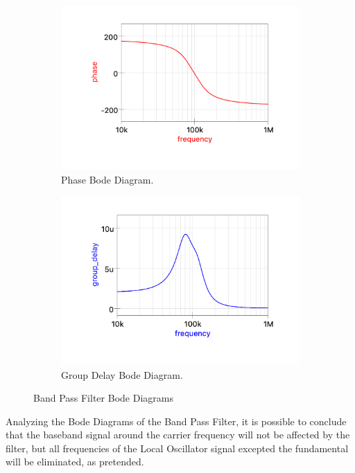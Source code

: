 \begin{figure}[H]
    \begin{subfigure}[b]{0.5\textwidth}
        \centering
        \includegraphics[width=\textwidth]{Images/Qucs_BPphase.png}
        \caption{Phase Bode Diagram.}
        \label{fig:Qucs_BPphase}
    \end{subfigure}%
    \begin{subfigure}[b]{0.5\textwidth}
        \centering
        \includegraphics[width=\textwidth]{Images/Qucs_BPgd.png}
        \caption{Group Delay Bode Diagram.}
        \label{fig:Qucs_BPgd}
    \end{subfigure}

    \caption{Band Pass Filter Bode Diagrams}
    \label{fig:Qucs_BPBode}
\end{figure}

Analyzing the Bode Diagrams of the Band Pass Filter, it is possible to conclude that the baseband signal around the carrier frequency will not be affected by the filter, but all frequencies of the Local Oscillator signal excepted the fundamental will be eliminated, as pretended.

